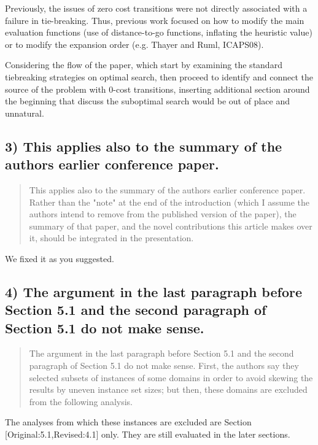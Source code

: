 \documentclass{article}
\begin{document}
Previously, the issues of zero cost transitions were not directly associated with 
a failure in tie-breaking. Thus, previous work focused on how to modify the main 
evaluation functions (use of distance-to-go functions, inflating the heuristic value)
or to modify the expansion order (e.g. Thayer and Ruml, ICAPS08).

Considering the flow of the paper,
which start by examining the standard tiebreaking strategies on optimal search,
then proceed to identify and connect the source of the problem with 0-cost transitions,
inserting additional section around the beginning that discuss the suboptimal search
would be out of place and unnatural.

\subsection{3) This applies also to the summary of the authors earlier conference paper.}
\label{sec:orgheadline27}

\begin{quote}
 This applies also to the summary of the authors earlier conference
paper. Rather than the "note" at the end of the introduction (which I
assume the authors intend to remove from the published version of the
paper), the summary of that paper, and the novel contributions this
article makes over it, should be integrated in the presentation.
\end{quote}

We fixed it as you suggested.

\subsection{4) The argument in the last paragraph before Section 5.1 and the second paragraph of Section 5.1 do not make sense.}
\label{sec:orgheadline28}

\begin{quote}
 The argument in the last paragraph before Section 5.1 and the second
paragraph of Section 5.1 do not make sense. First, the authors say
they selected subsets of instances of some domains in order to avoid
skewing the results by uneven instance set sizes; but then, these
domains are excluded from the following analysis.
\end{quote}

The analyses from which these instances are excluded are Section [Original:5.1,Revised:4.1] only.
They are still evaluated in the later sections.
\end{document}
